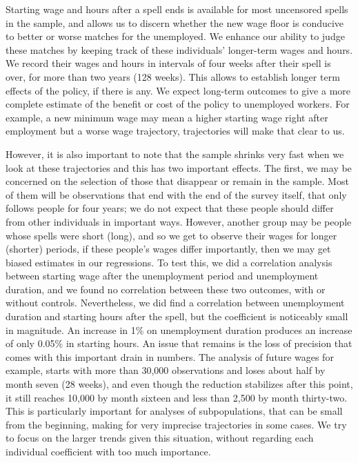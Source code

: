 \documentclass{article}
\begin{document}
Starting wage and hours after a spell ends is available for most uncensored spells in the sample, and allows us to discern whether the new wage floor is conducive to better or worse matches for the unemployed. We enhance our ability to judge these matches by keeping track of these individuals' longer-term wages and hours. We record their wages and hours in intervals of four weeks after their spell is over, for more than two years (128 weeks). This allows to establish longer term effects of the policy, if there is any. We expect long-term outcomes to give a more complete estimate of the benefit or cost of the policy to unemployed workers. For example, a new minimum wage may mean a higher starting wage right after employment but a worse wage trajectory, trajectories will make that clear to us.

However, it is also important to note that the sample shrinks very fast when we look at these trajectories and this has two important effects. The first, we may be concerned on the selection of those that disappear or remain in the sample. Most of them will be observations that end with the end of the survey itself, that only follows people for four years; we do not expect that these people should differ from other individuals in important ways. However, another group may be people whose spells were short (long), and so we get to observe their wages for longer (shorter) periods, if these people's wages differ importantly, then we may get biased estimates in our regressions. To test this, we did a correlation analysis between starting wage after the unemployment period and unemployment duration, and we found no correlation between these two outcomes, with or without controls. Nevertheless, we did find a correlation between unemployment duration and starting hours after the spell, but the coefficient is noticeably small in magnitude. An increase in 1\% on unemployment duration produces an increase of only 0.05\% in starting hours. An issue that remains is the loss of precision that comes with this important drain in numbers. The analysis of future wages for example, starts with more than 30,000 observations and loses about half by month seven (28 weeks), and even though the reduction stabilizes after this point, it still reaches 10,000 by month sixteen and less than 2,500 by month thirty-two. This is particularly important for analyses of subpopulations, that can be small from the beginning, making for very imprecise trajectories in some cases. We try to focus on the larger trends given this situation, without regarding each individual coefficient with too much importance.
\end{document}
